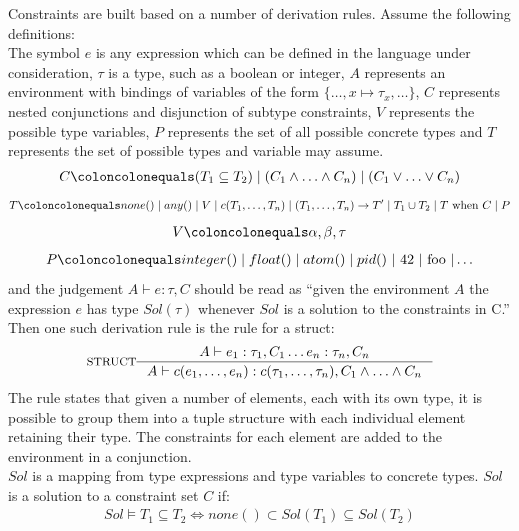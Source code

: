 \documentclass[12pt, titlepage]{article}
\begin{document}
\indent Constraints are built based on a number of derivation rules. Assume the following definitions: \\
\indent The symbol $e$ is any expression which can be defined in the language under consideration, $\tau$ is a type, such as a boolean or integer, $A$ represents an environment with bindings of variables of the form $\{\ldots, x \mapsto \tau_x, \ldots\}$, $C$ represents nested conjunctions and disjunction of subtype constraints, $V$ represents the possible type variables, $P$ represents the set of all possible concrete types and $T$ represents the set of possible types and variable may assume.
\begin{align*} 
	C \coloncolonequals (T_1 \subseteq T_2) \mid (C_1 \land \ldots \land C_n) \mid (C_1 \lor \ldots \lor C_n)
\end{align*}
\begin{align*} 
	T \coloncolonequals none() \mid any() \mid V \mid c(T_1, \ldots, T_n) \mid (T_1, \ldots, T_n) \rightarrow T'\mid T_1 \cup T_2 \mid T \text{ when } C \mid P
\end{align*}
\begin{align*} 
	V \coloncolonequals \alpha, \beta, \tau
\end{align*}
\begin{align*} 
	P \coloncolonequals integer() \mid float() \mid atom() \mid pid()\text{ } | \text{ 42 } | \text{ foo } | \ldots
\end{align*}
and the judgement $A \vdash e : \tau, C$ should be read as ``given the environment $A$ the expression $e$ has type $Sol(\tau)$ whenever $Sol$ is a solution to the constraints in C.'' \\
\indent Then one such derivation rule is the rule for a struct:
                \[
\inference*[STRUCT]{  A \vdash  e_1 : \tau_1, C_1 \ldots e_n : \tau_n, C_n}
                                        {A \vdash  c(e_1, \ldots, e_n) : c(\tau_1, \ldots, \tau_n), C_1 \land \ldots \land C_n}
                \]
The rule states that given a number of elements, each with its own type, it is possible to group them into a tuple structure with each individual element retaining their type. The constraints for each element are added to the environment in a conjunction. \\
\indent $Sol$ is a mapping from type expressions and type variables to concrete types. $Sol$ is a solution to a constraint set $C$ if:
\begin{align*} 
	Sol \models T_1 \subseteq T_2 \iff none() \subset Sol(T_1) \subseteq Sol(T_2)
\end{align*}
\end{document}

